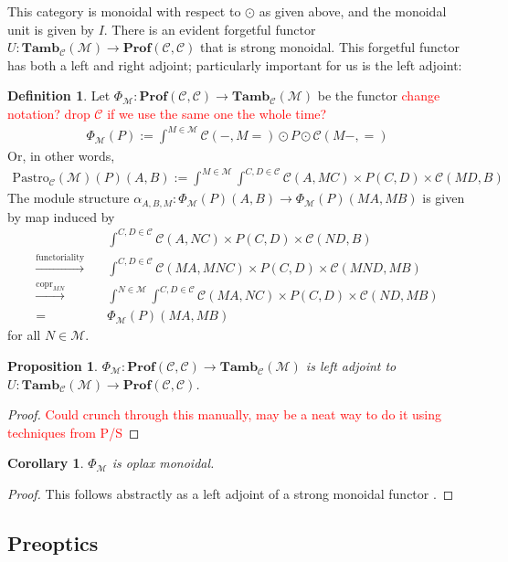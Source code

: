 \documentclass[11pt,a4paper]{article}
\theoremstyle{plain}
\newtheorem{proposition}[theorem]{Proposition}
\newtheorem{corollary}[theorem]{Corollary}
\theoremstyle{definition}
\newtheorem{definition}[theorem]{Definition}
\newcommand{\C}{\mathscr{C}}
\newcommand{\M}{\mathscr{M}}
\newcommand{\Pastro}{\Phi}
\newcommand{\Prof}{\mathbf{Prof}}
\newcommand{\Tamb}{\mathbf{Tamb}}
\DeclareMathOperator{\copr}{copr}
\newcommand{\todo}[1]{\textcolor{red}{\small #1}}
\begin{document}
This category is monoidal with respect to $\odot$ as given above, and the monoidal unit is given by $I$. There is an evident forgetful functor $U : \Tamb_\C(\M) \to \Prof(\C, \C)$ that is strong monoidal. This forgetful functor has both a left and right adjoint; particularly important for us is the left adjoint:

\begin{definition}
Let $\Pastro_\M : \Prof(\C, \C) \to \Tamb_\C(\M)$ be the functor \todo{change notation? drop $\C$ if we use the same one the whole time?}
\begin{align*}
\Pastro_\M(P) := \int^{M \in \M}  \C(-, M{=}) \odot P \odot \C(M-, {=}) 
\end{align*}
Or, in other words, 
\begin{align*}
\mathrm{Pastro}_\C(\M)(P)(A,B) := \int^{M \in \M} \int^{C,D \in \C} \C(A, MC) \times P(C,D) \times  \C(MD, B)
\end{align*}
The module structure $\alpha_{A,B,M} : \Pastro_\M(P)(A,B) \to \Pastro_\M(P)(MA, MB)
$ is given by map induced by 
\begin{align*}
&\int^{C,D \in \C} \C(A, NC) \times P(C,D) \times  \C(ND, B) \\
\xrightarrow{\text{functoriality}} \quad& \int^{C,D \in \C} \C(MA, MNC) \times P(C,D) \times  \C(MND, MB) \\
\xrightarrow{\copr_{MN}} \quad&\int^{N \in \M} \int^{C,D \in \C} \C(MA, NC) \times P(C,D) \times  \C(ND, MB) \\
= \quad&\Pastro_\M(P)(MA, MB)
\end{align*}
for all $N \in \M$.
\end{definition}

\begin{proposition}
$\Pastro_\M : \Prof(\C, \C) \to \Tamb_\C(\M)$ is left adjoint to $U : \Tamb_\C(\M) \to \Prof(\C, \C)$.
\end{proposition}
\begin{proof}
\todo{Could crunch through this manually, may be a neat way to do it using techniques from P/S}
\end{proof}

\begin{corollary}
$\Pastro_\M$ is oplax monoidal.
\end{corollary}
\begin{proof}
This follows abstractly as a left adjoint of a strong monoidal functor \cite{Kelly1974}.
\end{proof}

\subsection{Preoptics}
\end{document}

